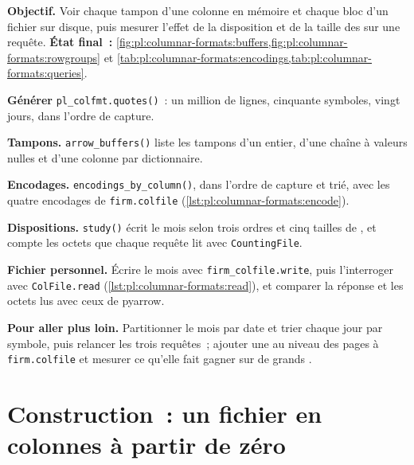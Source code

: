 \begin{tutorial}
\textbf{Objectif.} Voir chaque tampon d'une colonne en mémoire et chaque bloc d'un fichier sur disque, puis mesurer l'effet de la disposition et de la taille des
 sur une requête. \textbf{État final~:} \cref{fig:pl:columnar-formats:buffers,fig:pl:columnar-formats:rowgroups} et
\cref{tab:pl:columnar-formats:encodings,tab:pl:columnar-formats:queries}.
\begin{tutsteps}
\item \textbf{Générer} \texttt{pl\_colfmt.quotes()}~: un million de lignes, cinquante symboles, vingt jours, dans l'ordre de capture.
\item \textbf{Tampons.} \texttt{arrow\_buffers()} liste les tampons d'un entier, d'une chaîne à valeurs nulles et d'une colonne par dictionnaire.
\item \textbf{Encodages.} \texttt{encodings\_by\_column()}, dans l'ordre de capture et trié, avec les quatre
encodages de \texttt{firm.colfile} (\cref{lst:pl:columnar-formats:encode}).
\item \textbf{Dispositions.} \texttt{study()} écrit le mois selon trois ordres et cinq tailles de , et compte les octets que chaque requête
lit avec \texttt{CountingFile}.
\item \textbf{Fichier personnel.} Écrire le mois avec \texttt{firm\_colfile.write}, puis l'interroger avec \texttt{ColFile.read}
(\cref{lst:pl:columnar-formats:read}), et comparer la réponse et les octets lus avec ceux de pyarrow.
\end{tutsteps}
\textbf{Pour aller plus loin.} Partitionner le mois par date et trier chaque jour par symbole, puis relancer les trois requêtes~; ajouter une
 au niveau des pages à \texttt{firm.colfile} et mesurer ce qu'elle fait gagner sur de grands .
\end{tutorial}

\section{Construction~: un fichier en colonnes à partir de zéro}\label{bld:pl:columnar-formats:colfile}

